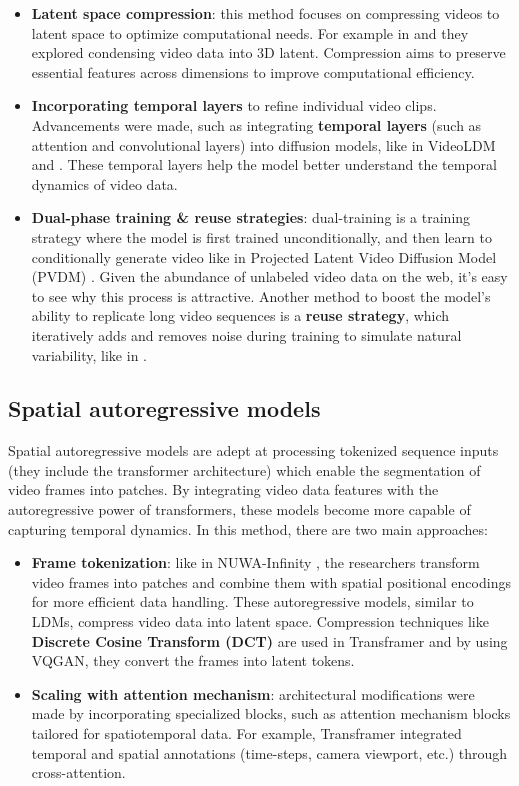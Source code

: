 \begin{itemize}
    \item \textbf{Latent space compression}: this method focuses on compressing videos to latent space to optimize computational needs. For example in \cite{zeng2024make} and \cite{gu2023reuse} they explored condensing video data into 3D latent. Compression aims to preserve essential features across dimensions to improve computational efficiency.
    \item \textbf{Incorporating temporal layers} to refine individual video clips. Advancements were made, such as integrating \textbf{temporal layers} (such as attention and convolutional layers) into diffusion models, like in VideoLDM \cite{video_ldm} and \cite{gu2023reuse}. These temporal layers help the model better understand the temporal dynamics of video data.
    \item \textbf{Dual-phase training \& reuse strategies}: dual-training is a training strategy where the model is first trained unconditionally, and then learn to conditionally generate video like in Projected Latent Video Diffusion Model (PVDM) \cite{pvdm}. Given the abundance of unlabeled video data on the web, it's easy to see why this process is attractive. Another method to boost the model's ability to replicate long video sequences is a \textbf{reuse strategy}, which iteratively adds and removes noise during training to simulate natural variability, like in \cite{gu2023reuse}.
\end{itemize}

\subsection*{Spatial autoregressive models}

Spatial autoregressive models are adept at processing tokenized sequence inputs (they include the transformer architecture) which enable the segmentation of video frames into patches. By integrating video data features with the autoregressive power of transformers, these models become more capable of capturing temporal dynamics. In this method, there are two main approaches:

\begin{itemize}
    \item \textbf{Frame tokenization}: like in NUWA-Infinity \cite{nuwa_infinity}, the researchers transform video frames into patches and combine them with spatial positional encodings for more efficient data handling. These autoregressive models, similar to LDMs, compress video data into latent space. Compression techniques like \textbf{Discrete Cosine Transform (DCT)} are used in Transframer \cite{transframer} and by using VQGAN, they convert the frames into latent tokens.
    \item \textbf{Scaling with attention mechanism}: architectural modifications were made by incorporating specialized blocks, such as attention mechanism blocks tailored for spatiotemporal data. For example, Transframer \cite{transframer} integrated temporal and spatial annotations (time-steps, camera viewport, etc.) through cross-attention.
\end{itemize}

